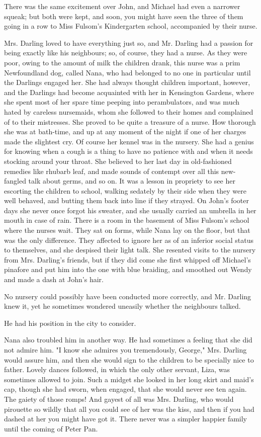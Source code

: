 There was the same excitement over John, and Michael had even a narrower
squeak; but both were kept, and soon, you might have seen the three of
them going in a row to Miss Fulsom's Kindergarten school, accompanied by
their nurse.


Mrs. Darling loved to have everything just so, and Mr. Darling had a
passion for being exactly like his neighbours; so, of course, they had a
nurse. As they were poor, owing to the amount of milk the children drank,
this nurse was a prim Newfoundland dog, called Nana, who had belonged to
no one in particular until the Darlings engaged her. She had always
thought children important, however, and the Darlings had become
acquainted with her in Kensington Gardens, where she spent most of her
spare time peeping into perambulators, and was much hated by careless
nursemaids, whom she followed to their homes and complained of to their
mistresses. She proved to be quite a treasure of a nurse. How thorough she
was at bath-time, and up at any moment of the night if one of her charges
made the slightest cry. Of course her kennel was in the nursery. She had a
genius for knowing when a cough is a thing to have no patience with and
when it needs stocking around your throat. She believed to her last day in
old-fashioned remedies like rhubarb leaf, and made sounds of contempt over
all this new-fangled talk about germs, and so on. It was a lesson in
propriety to see her escorting the children to school, walking sedately by
their side when they were well behaved, and butting them back into line if
they strayed. On John's footer days she never once forgot his sweater, and she
usually carried an umbrella in her mouth in case of rain. There is a room
in the basement of Miss Fulsom's school where the nurses wait. They sat on
forms, while Nana lay on the floor, but that was the only difference. They
affected to ignore her as of an inferior social status to themselves, and
she despised their light talk. She resented visits to the nursery from
Mrs. Darling's friends, but if they did come she first whipped off
Michael's pinafore and put him into the one with blue braiding, and
smoothed out Wendy and made a dash at John's hair.


No nursery could possibly have been conducted more correctly, and Mr.
Darling knew it, yet he sometimes wondered uneasily whether the neighbours
talked.


He had his position in the city to consider.


Nana also troubled him in another way. He had sometimes a feeling that she
did not admire him. "I know she admires you tremendously, George," Mrs.
Darling would assure him, and then she would sign to the children to be
specially nice to father. Lovely dances followed, in which the only other
servant, Liza, was sometimes allowed to join. Such a midget she looked in
her long skirt and maid's cap, though she had sworn, when engaged, that
she would never see ten again. The gaiety of those romps! And gayest of
all was Mrs. Darling, who would pirouette so wildly that all you could see
of her was the kiss, and then if you had dashed at her you might have got
it. There never was a simpler happier family until the coming of Peter
Pan.


